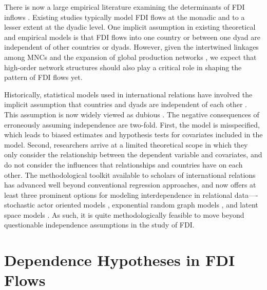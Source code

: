 \documentclass{article}
\begin{document}
There is now a large empirical literature examining the determinants of FDI inflows \citep[e.g.,][]{Noorbakhsh_et_al:2001,Yeaple:2003,Jensen:2003,Li_Resnick:2003,Buthe_Milner:2008,Li_Vashchilko:2010,Kerner:2009}. Existing studies typically model FDI flows at the monadic and to a lesser extent at the dyadic level. One implicit assumption in existing theoretical and empirical models is that FDI flows into one country or between one dyad are independent of other countries or dyads. However, given the intertwined linkages among MNCs and the expansion of global production networks \citep{UNCTAD:2013}, we expect that high-order network structures should also play a critical role in shaping the pattern of FDI flows yet. 

Historically, statistical models used in international relations have involved the implicit assumption that countries and dyads are independent of each other \citep{diehl2016conditional,ward2007persistent}. This assumption is now widely viewed as dubious \citep[see, e.g., ][]{ward2007persistent, chu2010homogenization,cranmer2016critique,dorff2013networks,lee2013network,howell2013geography,kinne2016agreeing}. The negative consequences of erroneously assuming independence are two-fold. First, the model is misspecified, which leads to biased estimates and hypothesis tests for covariates included in the model. Second, researchers arrive at a limited theoretical scope in which they only consider the relationship between the dependent variable and covariates, and do not consider the influences that relationships and countries have on each other. The methodological toolkit available to scholars of international relations has advanced well beyond conventional regression approaches, and now offers at least three prominent options for modeling interdependence in relational data----stochastic actor oriented models \citep[e.g., ][]{camber2010geometry,kinne2016agreeing,kinne2013network,kinne2014dependent,warren2016modeling}, exponential random graph models \citep[e.g.,][]{cranmer2012complex,cranmer2012toward,raeymaeckers2016influence}, and latent space models \citep[e.g., ][]{ward2007disputes,ward2013gravity,metternich2013antigovernment}. As such, it is quite methodologically feasible to move beyond questionable independence assumptions in the study of FDI.


\section{Dependence Hypotheses in FDI Flows}
\end{document}
